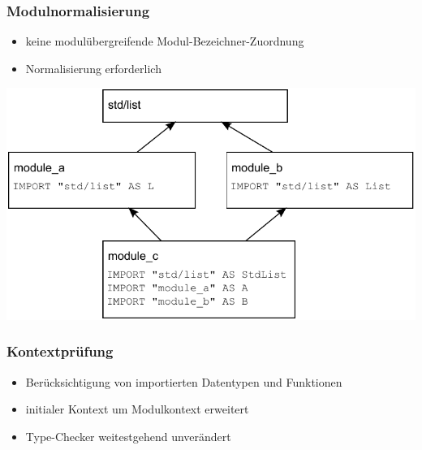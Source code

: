 \begin{frame}[containsverbatim=true]
\frametitle{Modulnormalisierung}

\begin{itemize}
\item keine modulübergreifende Modul-Bezeichner-Zuordnung
\item Normalisierung erforderlich
\end{itemize}

\includegraphics[width=1\linewidth]{depsModABC}

\end{frame}


\begin{frame}
\frametitle{Kontextprüfung}

\begin{itemize}
\item Berücksichtigung von importierten Datentypen und Funktionen
\item initialer Kontext um Modulkontext erweitert
\item Type-Checker weitestgehend unverändert
\end{itemize}

\end{frame}
